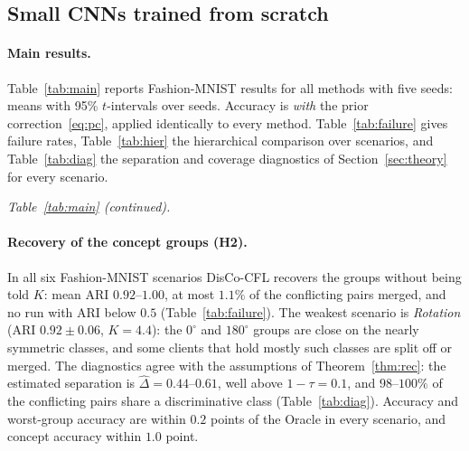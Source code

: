 \subsection{Small CNNs trained from scratch}\label{sec:small}
\paragraph{Main results.}
Table~\ref{tab:main} reports Fashion-MNIST results for all methods with five seeds: means with 95\% $t$-intervals over seeds. Accuracy is \emph{with} the prior correction~\eqref{eq:pc}, applied identically to every method. Table~\ref{tab:failure} gives failure rates, Table~\ref{tab:hier} the hierarchical comparison over scenarios, and Table~\ref{tab:diag} the separation and coverage diagnostics of Section~\ref{sec:theory} for every scenario.

\begin{tableorg}[!htbp]
\centering
\caption{Fashion-MNIST, 40 clients, 5 seeds: mean $\pm$ half-width of the 95\% $t$-interval over seeds. $n$: number of seeds. Acc: mean local accuracy with prior correction. Concept: accuracy on the class-balanced test set of the client's concept. Worst-grp: accuracy of the worst concept group. Conflict: fraction of conflicting client pairs placed in one cluster (merge and attachment stages combined). IFCA, FeSEM, FL+HC, PACFL and FedDAG-C receive the true $K$ (in \emph{Label skew only}, $K=1$); DisCo-CFL, MTCFL, StoCFL and FedCCFA find it. For FedCCFA, ARI and $K$ refer to the client partition induced by its per-class clusters.}\label{tab:main}

\end{tableorg}

\begin{tableorg}[!htbp]
\centering
\noindent\textit{Table~\ref{tab:main} (continued).}\par\smallskip

\end{tableorg}

\paragraph{Recovery of the concept groups (H2).} In all six Fashion-MNIST scenarios DisCo-CFL recovers the groups without being told $K$: mean ARI $0.92$--$1.00$, at most $1.1\%$ of the conflicting pairs merged, and no run with ARI below $0.5$ (Table~\ref{tab:failure}). The weakest scenario is \emph{Rotation} (ARI $0.92\pm0.06$, $K=4.4$): the $0^\circ$ and $180^\circ$ groups are close on the nearly symmetric classes, and some clients that hold mostly such classes are split off or merged. The diagnostics agree with the assumptions of Theorem~\ref{thm:rec}: the estimated separation is $\hat\Delta=0.44$--$0.61$, well above $1-\tau=0.1$, and $98$--$100\%$ of the conflicting pairs share a discriminative class (Table~\ref{tab:diag}). Accuracy and worst-group accuracy are within $0.2$ points of the Oracle in every scenario, and concept accuracy within $1.0$ point.

